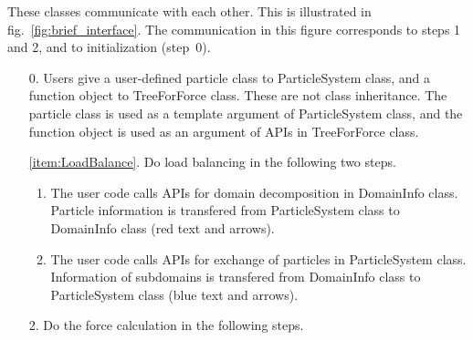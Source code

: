 These classes communicate with each other. This is illustrated in
fig.~\ref{fig:brief_interface}. The communication in this figure
corresponds to steps 1 and 2, and to initialization (step~0).
\begin{enumerate}
\item[0.] Users give a user-defined particle class to
  ParticleSystem class, and a function object to TreeForForce
  class. These are not class inheritance. The particle class is used as
  a template argument of ParticleSystem class, and the function
  object is used as an argument of APIs in TreeForForce class.

\item[\ref{item:LoadBalance}.] Do load balancing in the following two
  steps.
  \begin{enumerate}
  \item The user code calls APIs for domain decomposition in
    DomainInfo class. Particle information is transfered from
    ParticleSystem class to DomainInfo class (red text and arrows).
  \item The user code calls APIs for exchange of particles in
    ParticleSystem class. Information of subdomains is transfered from
    DomainInfo class to ParticleSystem class (blue text and arrows).
  \end{enumerate}

\item[2.] Do the force calculation in the following steps.


\end{enumerate}
